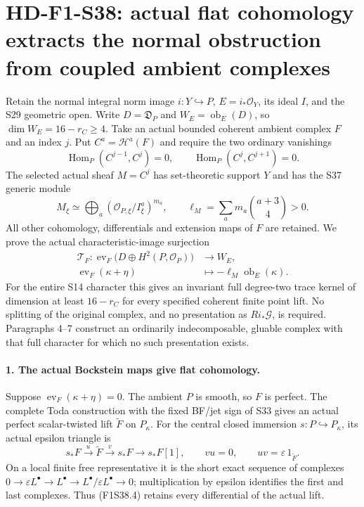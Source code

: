 \section[HD-F1-S38: coupled complexes with adjacent Hom vanishing]{HD-F1-S38: actual flat cohomology extracts the normal obstruction from coupled ambient complexes}
\label{sec:f1-norm-fourfold-adjacent-cohomology-support}

Retain the normal integral norm image $i:Y\hookrightarrow P$,
$E=i_*\mathcal O_Y$, its ideal $I$, and the S29 geometric open.
Write $D=\mathfrak D_P$ and
$W_E=\operatorname{ob}_E(D)$, so $\dim W_E=16-r_C\ge4$.
Take an actual bounded coherent ambient complex $F$ and an index $j$.
Put $C^a=\mathcal H^a(F)$ and require the two ordinary vanishings
\[
 \operatorname{Hom}_P(C^{j-1},C^j)=0,
 \qquad \operatorname{Hom}_P(C^j,C^{j+1})=0.
 \tag{F1S38.1}
\]
The selected actual sheaf $M=C^j$ has set-theoretic support $Y$
and has the S37 generic module
\[
 M_\xi\simeq\bigoplus_a
   (\mathcal O_{P,\xi}/I_\xi^a)^{m_a},\qquad
 \ell_M=\sum_a m_a\binom{a+3}{4}>0.
 \tag{F1S38.2}
\]
All other cohomology, differentials and extension maps of $F$ are
retained. We prove the actual characteristic-image surjection
\[
\begin{split}
 \mathcal T_F:\operatorname{ev}_F
       \bigl(D\oplus H^2(P,\mathcal O_P)\bigr)&\longrightarrow W_E,\\
 \operatorname{ev}_F(\kappa+\eta)&\longmapsto
                                  -\ell_M\operatorname{ob}_E(\kappa).
\end{split}
 \tag{F1S38.3}
\]
For the entire S14 character this gives an invariant full
degree-two trace kernel of dimension at least $16-r_C$ for
every specified coherent finite point lift. No splitting of the
original complex, and no presentation as $Ri_*\mathcal G$, is
required. Paragraphs 4--7 construct an ordinarily indecomposable,
gluable complex with that full character for which no such
presentation exists.

\paragraph{1. The actual Bockstein maps give flat cohomology.}
Suppose $\operatorname{ev}_F(\kappa+\eta)=0$.
The ambient $P$ is smooth, so $F$ is perfect. The complete Toda
construction with the fixed BF/jet sign of S33 gives an actual
perfect scalar-twisted lift $\widetilde F$ on $P_\kappa$.
For the central closed immersion $s:P\hookrightarrow P_\kappa$,
its actual epsilon triangle is
\[
 s_*F\xrightarrow{\,u\,}\widetilde F
       \xrightarrow{\,v\,}s_*F\longrightarrow s_*F[1],
 \qquad vu=0,\qquad uv=\varepsilon\,1_{\widetilde F}.
 \tag{F1S38.4}
\]
On a local finite free representative it is the short exact
sequence of complexes
$0\to\varepsilon L^\bullet\to L^\bullet
\to L^\bullet/\varepsilon L^\bullet\to0$;
multiplication by epsilon identifies the first and last complexes.
Thus (F1S38.4) retains every differential of the actual lift.

